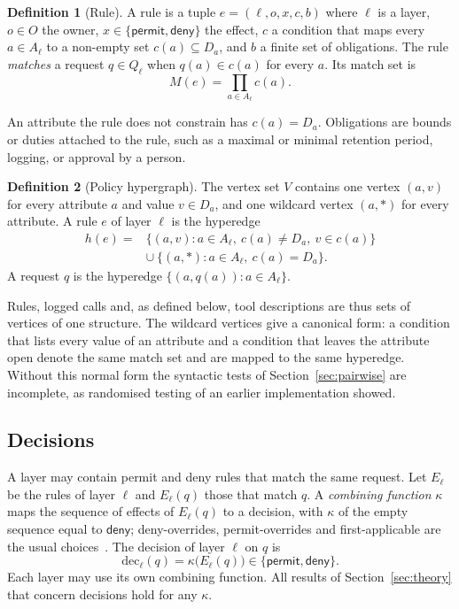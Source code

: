 \documentclass[preprint,12pt]{elsarticle}
\theoremstyle{definition}
\newtheorem{definition}{Definition}
\theoremstyle{remark}
\newcommand{\permit}{\mathsf{permit}}
\newcommand{\deny}{\mathsf{deny}}
\newcommand{\dec}{\mathrm{dec}}
\begin{document}
\begin{definition}[Rule]\label{def:rule}
A rule is a tuple $e = (\ell, o, x, c, b)$ where $\ell$ is a layer, $o \in O$ the owner, $x \in \{\permit, \deny\}$ the effect, $c$ a condition that maps every $a \in A_\ell$ to a non-empty set $c(a) \subseteq D_a$, and $b$ a finite set of obligations. The rule \emph{matches} a request $q \in Q_\ell$ when $q(a) \in c(a)$ for every $a$. Its match set is
\begin{equation}
M(e) = \prod_{a \in A_\ell} c(a). \label{eq:matchset}
\end{equation}
\end{definition}
An attribute the rule does not constrain has $c(a) = D_a$. Obligations are bounds or duties attached to the rule, such as a maximal or minimal retention period, logging, or approval by a person.

\begin{definition}[Policy hypergraph]\label{def:hypergraph}
The vertex set $V$ contains one vertex $(a, v)$ for every attribute $a$ and value $v \in D_a$, and one wildcard vertex $(a, \ast)$ for every attribute. A rule $e$ of layer $\ell$ is the hyperedge
\begin{align*}
h(e) ={}& \{(a, v) : a \in A_\ell,\ c(a) \neq D_a,\ v \in c(a)\}\\
& \cup\ \{(a, \ast) : a \in A_\ell,\ c(a) = D_a\}.
\end{align*}
A request $q$ is the hyperedge $\{(a, q(a)) : a \in A_\ell\}$.
\end{definition}
Rules, logged calls and, as defined below, tool descriptions are thus sets of vertices of one structure. The wildcard vertices give a canonical form: a condition that lists every value of an attribute and a condition that leaves the attribute open denote the same match set and are mapped to the same hyperedge. Without this normal form the syntactic tests of Section~\ref{sec:pairwise} are incomplete, as randomised testing of an earlier implementation showed.

\subsection{Decisions}
A layer may contain permit and deny rules that match the same request. Let $E_\ell$ be the rules of layer $\ell$ and $E_\ell(q)$ those that match $q$. A \emph{combining function} $\kappa$ maps the sequence of effects of $E_\ell(q)$ to a decision, with $\kappa$ of the empty sequence equal to $\deny$; deny-overrides, permit-overrides and first-applicable are the usual choices~\cite{oasis2013xacml}. The decision of layer $\ell$ on $q$ is
\begin{equation}
\dec_\ell(q) = \kappa\bigl(E_\ell(q)\bigr) \in \{\permit, \deny\}. \label{eq:decision}
\end{equation}
Each layer may use its own combining function. All results of Section~\ref{sec:theory} that concern decisions hold for any $\kappa$.
\end{document}
